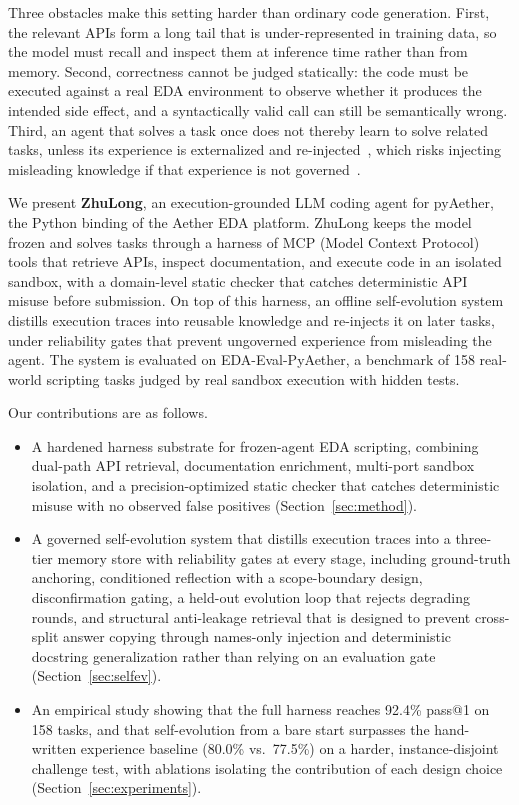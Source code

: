 \documentclass[conference]{IEEEtran}
\begin{document}
Three obstacles make this setting harder than ordinary code generation.
First, the relevant APIs form a long tail that is under-represented in
training data, so the model must recall and inspect them at inference time
rather than from memory. Second, correctness cannot be judged statically: the
code must be executed against a real EDA environment to observe whether it
produces the intended side effect, and a syntactically valid call can still be
semantically wrong. Third, an agent that solves a task once does not thereby
learn to solve related tasks, unless its experience is externalized and
re-injected~\cite{wang2023voyager,zhao2024expel}, which risks injecting
misleading knowledge if that experience is not
governed~\cite{zhao2024expel,yang2026skillopt}.

We present \textbf{ZhuLong}, an execution-grounded LLM coding agent for
pyAether, the Python binding of the Aether EDA platform. ZhuLong keeps the
model frozen and solves tasks through a harness of MCP (Model Context Protocol) tools that retrieve
APIs, inspect documentation, and execute code in an isolated sandbox, with a
domain-level static checker that catches deterministic API misuse before
submission. On top of this harness, an offline self-evolution system distills
execution traces into reusable knowledge and re-injects it on later tasks,
under reliability gates that prevent ungoverned experience from misleading
the agent. The system is evaluated on EDA-Eval-PyAether, a benchmark of 158
real-world scripting tasks judged by real sandbox execution with hidden tests.

Our contributions are as follows.
\begin{itemize}[leftmargin=*]
\item A hardened harness substrate for frozen-agent EDA scripting, combining
dual-path API retrieval, documentation
enrichment, multi-port sandbox isolation, and a precision-optimized static
checker that catches deterministic misuse with no observed false positives
(Section~\ref{sec:method}).
\item A governed self-evolution system that distills execution traces into a
three-tier memory store with reliability gates at every stage, including
ground-truth anchoring, conditioned reflection with a scope-boundary design,
disconfirmation gating, a held-out evolution loop that rejects degrading
rounds, and structural anti-leakage retrieval that is designed to prevent cross-split
answer copying through names-only injection and deterministic docstring
generalization rather than relying on an evaluation gate
(Section~\ref{sec:selfev}).
\item An empirical study showing that the full harness reaches 92.4\% pass@1
on 158 tasks, and that self-evolution from a bare start surpasses the
hand-written experience baseline (80.0\% vs.\ 77.5\%) on a harder,
instance-disjoint challenge test, with ablations isolating the contribution
of each design choice (Section~\ref{sec:experiments}).
\end{itemize}
\end{document}
